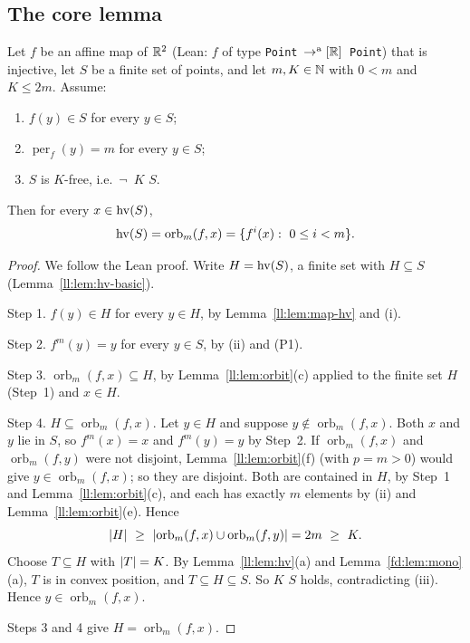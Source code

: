 \subsection{The core lemma}

\begin{theorem}\label{ll:thm:core}
Let $f$ be an affine map of $\mathbb R^2$ (Lean: $f$ of type \texttt{Point}~$\to^{\mathrm a}[\mathbb R]$~\texttt{Point}) that is
injective, let $S$ be a finite set of
points, and let $m,K\in\mathbb N$ with $0<m$ and $K\le 2m$. Assume:
\begin{enumerate}[label=(\roman*)]
\item $f(y)\in S$ for every $y\in S$;
\item $\operatorname{per}_f(y)=m$ for every $y\in S$;
\item $S$ is $K$-free, i.e.\ $\neg\,$ $K$ $S$.
\end{enumerate}
Then for every $x\in\operatorname{hv}(S)$,
\[\operatorname{hv}(S)=\operatorname{orb}_m(f,x)=\{f^i(x):\ 0\le i<m\}.\]
\end{theorem}

\begin{proof}
We follow the Lean proof. Write $H=\operatorname{hv}(S)$, a finite set with $H\subseteq S$ (Lemma~\ref{ll:lem:hv-basic}).

Step 1. $f(y)\in H$ for every $y\in H$, by Lemma~\ref{ll:lem:map-hv} and (i).

Step 2. $f^m(y)=y$ for every $y\in S$, by (ii) and (P1).

Step 3. $\operatorname{orb}_m(f,x)\subseteq H$, by Lemma~\ref{ll:lem:orbit}(c) applied to the finite set $H$
(Step~1) and $x\in H$.

Step 4. $H\subseteq\operatorname{orb}_m(f,x)$. Let $y\in H$ and suppose $y\notin\operatorname{orb}_m(f,x)$. Both $x$ and
$y$ lie in $S$, so $f^m(x)=x$ and $f^m(y)=y$ by Step~2. If $\operatorname{orb}_m(f,x)$ and $\operatorname{orb}_m(f,y)$
were not disjoint, Lemma~\ref{ll:lem:orbit}(f) (with $p=m>0$) would give $y\in\operatorname{orb}_m(f,x)$; so they are
disjoint. Both are contained in $H$, by Step~1 and Lemma~\ref{ll:lem:orbit}(c), and each has exactly $m$ elements by
(ii) and Lemma~\ref{ll:lem:orbit}(e). Hence
\[\card H\ \ge\ \card{\operatorname{orb}_m(f,x)\cup\operatorname{orb}_m(f,y)}=2m\ \ge\ K .\]
Choose $T\subseteq H$ with $\lvert T\rvert=K$. By Lemma~\ref{ll:lem:hv}(a) and Lemma~\ref{fd:lem:mono}(a), $T$ is in convex
position, and $T\subseteq H\subseteq S$. So  $K$ $S$ holds, contradicting (iii). Hence
$y\in\operatorname{orb}_m(f,x)$.

Steps 3 and 4 give $H=\operatorname{orb}_m(f,x)$.
\end{proof}

